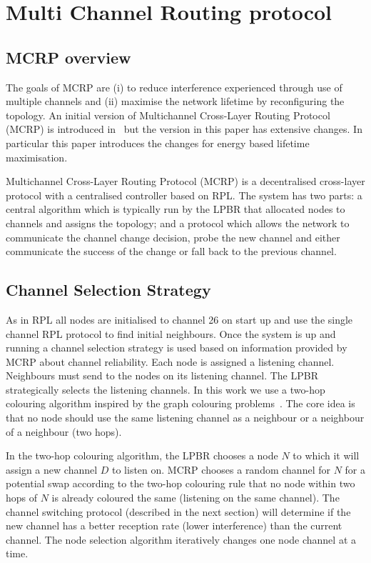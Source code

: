 \section{Multi Channel Routing protocol}
\label{MCRP}

\subsection{MCRP overview}
The goals of MCRP are (i) to reduce interference experienced through use of multiple channels and (ii) maximise the network lifetime by reconfiguring the topology. 
An initial version of Multichannel Cross-Layer Routing Protocol (MCRP) is introduced in~\cite{mcrp} but the version in this paper has extensive changes.  In particular this paper introduces the changes for energy based lifetime maximisation.

Multichannel Cross-Layer Routing Protocol (MCRP) \cite{mcrp} is a decentralised cross-layer protocol with a centralised controller based on RPL.  The system has two parts: a central algorithm which is typically run by the LPBR that allocated nodes to channels and assigns the topology; and a protocol which allows the network to communicate the channel change decision, probe the new channel and either communicate the success of the change or fall back to the previous channel. 

\subsection{Channel Selection Strategy}
As in RPL all nodes are initialised to channel 26 on start up and use the single channel RPL protocol to find initial neighbours.  Once the system is up and running a channel selection strategy is used based on information provided by MCRP about channel reliability.  Each node is assigned a listening channel.  Neighbours must send to the nodes on its listening channel.  The LPBR strategically selects the listening channels.  In this work we use a two-hop colouring algorithm inspired by the graph colouring problems~\cite{graphColouring}. The core idea is that no node should use the same listening channel as a neighbour or a neighbour of a neighbour (two hops).

In the two-hop colouring algorithm, the LPBR chooses a node $N$ to which it will assign a new channel $D$ to listen on.  MCRP chooses a random channel for $N$ for a potential swap according to the two-hop colouring rule that no node within two hops of $N$ is already coloured the same (listening on the same channel).  The channel switching protocol (described in the next section) will determine if the new channel has a better reception rate (lower interference) than the current channel.  The node selection algorithm iteratively changes one node channel at a time. 



